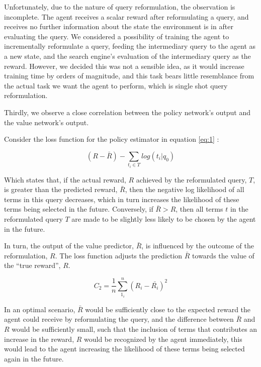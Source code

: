 Unfortunately, due to the nature of query reformulation, the observation is incomplete. The agent receives a scalar reward after reformulating a query, and receives no further information about the state the environment is in after evaluating the query. We considered a possibility of training the agent to incrementally reformulate a query, feeding the intermediary query to the agent as a new state, and the search engine’s evaluation of the intermediary query as the reward. However, we decided this was not a sensible idea, as it would increase training time by orders of magnitude, and this task bears little resemblance from the actual task we want the agent to perform, which is single shot query reformulation.  

Thirdly, we observe a close correlation between the policy network’s output and the value network’s output. 

Consider the loss function for the policy estimator in equation \ref{eq:1} :

\begin{equation}\label{eq:1}
(R - \bar{R}) - \sum_{t_i \in T} log(t_i|q_0) 
\end{equation}


Which states that, if the actual reward, $R$ achieved by the reformulated query, $T$, is greater than the predicted reward, $\bar{R}$, then the negative log likelihood of all terms in this query decreases, which in turn increases the likelihood of these terms being selected in the future. Conversely, if $\bar{R} > R$, then all terms $t$ in the reformulated query $T$ are made to be slightly less likely to be chosen by the agent in the future.  

In turn, the output of the value predictor, $\bar{R}$, is influenced by the outcome of the reformulation, $R$. The loss function adjusts the prediction $\bar{R}$ towards the value of the ``true reward'', $R$.

\begin{equation}
C_2 = \frac{1}{n}\sum_{1_i}^{n}(R_i-\bar{R_i})^2
\end{equation}


In an optimal scenario, $\bar{R}$ would be sufficiently close to the expected reward the agent could receive by reformulating the query, and the difference between $\bar{R}$ and $R$ would be sufficiently small, such that the inclusion of terms that contributes an increase in the reward, $R$ would be recognized by the agent immediately, this would lead to the agent increasing the likelihood of these terms being selected again in the future.



